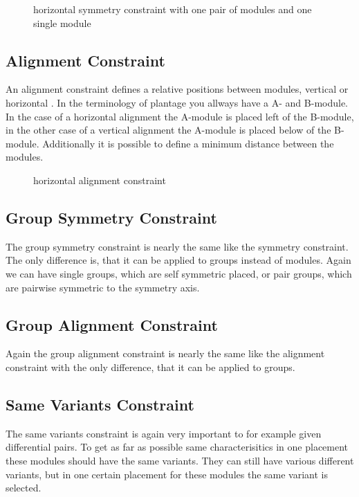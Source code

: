 \begin{figure}
	\centering
	
	\caption{horizontal symmetry constraint with one pair of modules and one single module}
	\label{fig:constraint_symmetry}
\end{figure}

\subsection{Alignment Constraint}
An alignment constraint defines a relative positions between modules, vertical or horizontal . In the terminology of plantage you allways have a A- and B-module. In the case of a horizontal alignment the A-module is placed left of the B-module, in the other case of a vertical alignment the A-module is placed below of the B-module. Additionally it is possible to define a minimum distance between the modules.

\begin{figure}
	\centering
	
	\caption{horizontal alignment constraint}
	\label{fig:constraint_alignment}
\end{figure}

\subsection{Group Symmetry Constraint}
The group symmetry constraint is nearly the same like the symmetry constraint. The only difference is, that it can be applied to groups instead of modules. Again we can have single groups, which are self symmetric placed, or pair groups, which are pairwise symmetric to the symmetry axis.

\subsection{Group Alignment Constraint}
Again the group alignment constraint is nearly the same like the alignment constraint with the only difference, that it can be applied to groups.

\subsection{Same Variants Constraint}
The same variants constraint is again very important to for example given differential pairs. To get as far as possible same characterisitics in one placement these modules should have the same variants. They can still have various different variants, but in one certain placement for these modules the same variant is selected.

